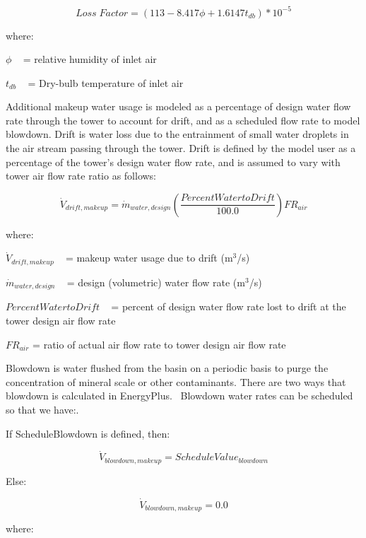 \begin{equation}
Loss\;Factor = (113 - 8.417\phi  + 1.6147{t_{db}})*{10^{ - 5}}
\end{equation}

where:

\(\phi\) ~ = relative humidity of inlet air

\({t_{db}}\) ~ = Dry-bulb temperature of inlet air

Additional makeup water usage is modeled as a percentage of design water flow rate through the tower to account for drift, and as a scheduled flow rate to model blowdown. Drift is water loss due to the entrainment of small water droplets in the air stream passing through the tower. Drift is defined by the model user as a percentage of the tower's design water flow rate, and is assumed to vary with tower air flow rate ratio as follows:

\begin{equation}
{\dot V_{drift,makeup}} = {\dot m_{water,design}}\left( {\frac{{PercentWatertoDrift}}{{100.0}}} \right)F{R_{air}}
\end{equation}

where:

\({\dot V_{drift,makeup}}\) ~ = makeup water usage due to drift (m\(^{3}\)/s)

\({\dot m_{water,design}}\) ~ = design (volumetric) water flow rate (m\(^{3}\)/s)

\(PercentWatertoDrift\) ~ = percent of design water flow rate lost to drift at the tower design air flow rate

\(F{R_{air}}\) = ratio of actual air flow rate to tower design air flow rate

Blowdown is water flushed from the basin on a periodic basis to purge the concentration of mineral scale or other contaminants. There are two ways that blowdown is calculated in EnergyPlus.~ Blowdown water rates can be scheduled so that we have:.

If ScheduleBlowdown is defined, then:

\begin{equation}
  \dot{V}_{blowdown,makeup} = ScheduleValue_{blowdown}
\end{equation}

Else:

\begin{equation}
  \dot{V}_{blowdown,makeup} = 0.0
\end{equation}

where:

